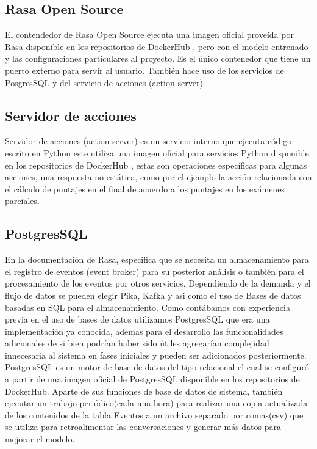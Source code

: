 \subsection{Rasa Open Source}
El contendedor de Rasa Open Source ejecuta una imagen oficial proveída por Rasa disponible en los
repositorios de DockerHub \cite{DockerHub}, pero con el modelo entrenado y las configuraciones
particulares al proyecto. Es el único contenedor que tiene un puerto externo para servir al
usuario. También hace uso de los servicios de PosgresSQL y del servicio de acciones (action
server).

\subsection{Servidor de acciones}
Servidor de acciones (action server) es un servicio interno que ejecuta código escrito en Python
este utiliza una imagen oficial para servicios Python disponible en los repositorios de
DockerHub \cite{DockerHub}, estas son operaciones específicas para algunas acciones, una respuesta
no estática, como por el ejemplo la acción relacionada con el cálculo de puntajes en el final de
acuerdo a los puntajes en los exámenes parciales.

\subsection{PostgresSQL}
En la documentación de Rasa, especifica que se necesita un almacenamiento para el registro de
eventos (event broker) para su posterior análisis o también para el procesamiento de los eventos
por otros
servicios. Dependiendo de la demanda y el flujo de datos se pueden elegir Pika, Kafka y asi como
el uso de Bases de datos basadas en SQL para el almacenamiento. \cite{event_broker} Como
contábamos con experiencia previa en el uso de bases de datos utilizamos PostgresSQL que era una
implementación ya conocida, ademas para el desarrollo las funcionalidades adicionales de  si bien
podrían haber sido útiles agregarían complejidad innecesaria al sistema en fases iniciales y pueden
ser adicionados posteriormente.
PostgresSQL es un motor de base de datos del tipo relacional\cite{postgresql} el cual se configuró
a partir de una imagen oficial de PostgresSQL disponible en los repositorios de
DockerHub\cite{DockerHub}. Aparte de sus funciones de base de datos de sistema, también ejecutar un
trabajo periódico(cada una hora) para realizar una copia actualizada de los contenidos de la tabla
Eventos a un archivo separado por comas(csv) que se utiliza para retroalimentar las conversaciones
y generar más datos para mejorar el modelo.

